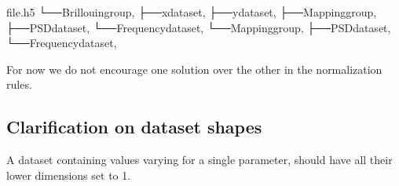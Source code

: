 \documentclass[letterpaper,10pt,english]{sphinxmanual}
\begin{document}
\begin{sphinxVerbatim}[commandchars=\\\{\}]
file.h5
└──Brillouingroup,
├──xdataset,
├──ydataset,
├──Mappinggroup,
├──PSDdataset,
└──Frequencydataset,
└──Mappinggroup,
├──PSDdataset,
└──Frequencydataset,
\end{sphinxVerbatim}

\sphinxAtStartPar
For now we do not encourage one solution over the other in the normalization rules.


\subsection{Clarification on dataset shapes}
\label{\detokenize{source/normalization:clarification-on-dataset-shapes}}
\sphinxAtStartPar
A dataset containing  values varying for a single parameter, should have all their lower dimensions set to 1.
\end{document}
